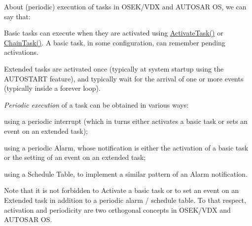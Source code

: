About (periodic) execution of tasks in O\+S\+E\+K/\+V\+DX and A\+U\+T\+O\+S\+AR OS, we can say that\+:
\begin{DoxyItemize}
\item Basic tasks can execute when they are activated using \mbox{\hyperlink{group__primitives-task_ga9d7cac8cf0b035942325538ba01ba7c6}{Activate\+Task()}} or \mbox{\hyperlink{group__primitives-task_ga89ce30708e79048336a17c62bb47e1c7}{Chain\+Task()}}. A basic task, in some configuration, can remember pending activations.
\item Extended tasks are activated once (typically at system startup using the A\+U\+T\+O\+S\+T\+A\+RT feature), and typically wait for the arrival of one or more events (typically inside a forever loop).
\item {\itshape Periodic execution} of a task can be obtained in various ways\+:
\begin{DoxyItemize}
\item using a periodic interrupt (which in turns either activates a basic task or sets an event on an extended task);
\item using a periodic Alarm, whose notification is either the activation of a basic task or the setting of an event on an extended task;
\item using a Schedule Table, to implement a similar pattern of an Alarm notification.
\item Note that it is not forbidden to Activate a basic task or to set an event on an Extended task in addition to a periodic alarm / schedule table. To that respect, activation and periodicity are two orthogonal concepts in O\+S\+E\+K/\+V\+DX and A\+U\+T\+O\+S\+AR OS. 
\end{DoxyItemize}
\end{DoxyItemize}
